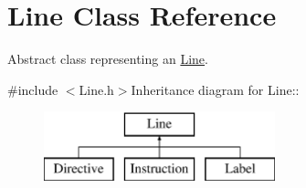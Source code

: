 \hypertarget{classLine}{
\section{Line Class Reference}
\label{classLine}
}


Abstract class representing an \hyperlink{classLine}{Line}.  


{\ttfamily \#include $<$Line.h$>$}Inheritance diagram for Line::\begin{figure}[H]
\begin{center}
\leavevmode
\includegraphics[height=2cm]{classLine}
\end{center}
\end{figure}
